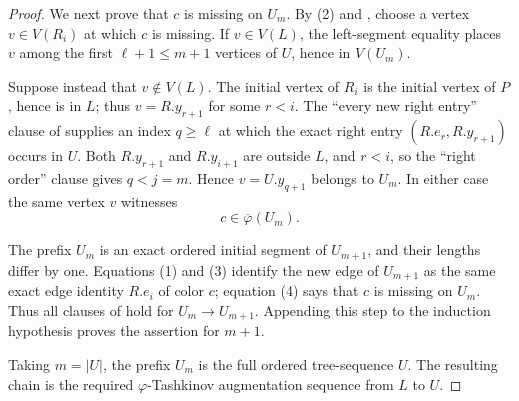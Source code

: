 \begin{proof}
We next prove that $c$ is missing on $U_m$.  By (2) and
, choose a vertex $v\in V(R_i)$ at which
$c$ is missing.  If $v\in V(L)$, the left-segment equality places
$v$ among the first $\ell+1\leq m+1$ vertices of $U$, hence in
$V(U_m)$.

Suppose instead that $v\notin V(L)$.  The initial vertex of $R_i$ is
the initial vertex of $P$, hence is in $L$; thus
$v=R.y_{r+1}$ for some $r<i$.  The ``every new right entry'' clause of
 supplies an index $q\geq\ell$ at which the
exact right entry $(R.e_r,R.y_{r+1})$ occurs in $U$.  Both
$R.y_{r+1}$ and $R.y_{i+1}$ are outside $L$, and $r<i$, so the
``right order'' clause gives $q<j=m$.  Hence $v=U.y_{q+1}$ belongs to
$U_m$.  In either case the same vertex $v$ witnesses
\[
                         c\in\overline\varphi(U_m).             \tag{4}
\]

The prefix $U_m$ is an exact ordered initial segment of $U_{m+1}$,
and their lengths differ by one.  Equations (1) and (3) identify the new
edge of $U_{m+1}$ as the same exact edge identity $R.e_i$ of color
$c$; equation (4) says that $c$ is missing on $U_m$.  Thus all
clauses of  hold for
$U_m\to U_{m+1}$.  Appending this step to the induction hypothesis
proves the assertion for $m+1$.

Taking $m=|U|$, the prefix $U_m$ is the full ordered tree-sequence
$U$.  The resulting chain is the required
$\varphi$-Tashkinov augmentation sequence from $L$ to $U$.
\end{proof}
